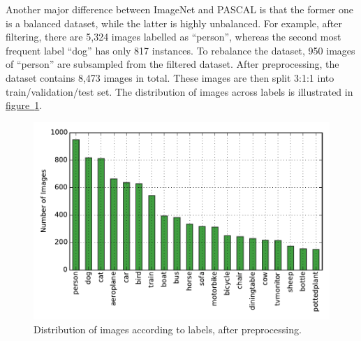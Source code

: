 \documentclass[11pt,a4paper]{book}
\begin{document}
Another major difference between ImageNet and PASCAL is that the former one is a balanced dataset, while the latter is highly unbalanced. For example, after filtering, there are 5,324 images labelled as ``person'', whereas the second most frequent label ``dog'' has only 817 instances. To rebalance the dataset, 950 images of ``person'' are subsampled from the filtered dataset.  After preprocessing, the dataset contains 8,473 images in total. These images are then split 3:1:1 into train/validation/test set. The distribution of images across labels is illustrated in \hyperref[fig:distro]{figure~\ref{fig:distro}}.
\begin{figure}[htbp]
\centering
\includegraphics[scale=0.8]{distro.pdf}
\caption{Distribution of images according to labels, after preprocessing.}
\label{fig:distro}
\end{figure}
\end{document}

